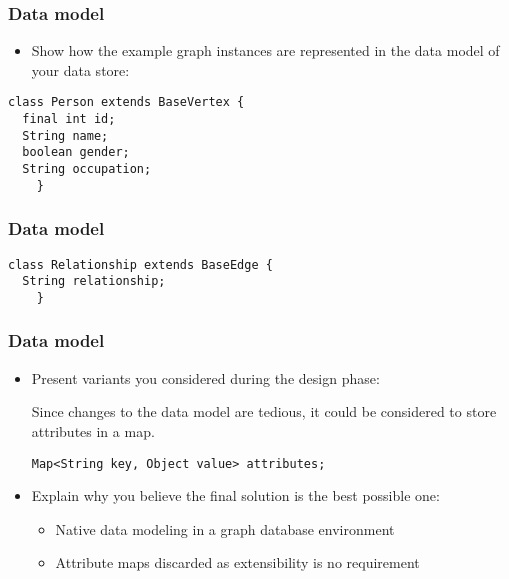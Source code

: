 
\begin{frame}[fragile]
\frametitle{Data model}

\begin{itemize}
	\item Show how the example graph instances are represented in the data model of your data store:
\end{itemize}

\begin{lstlisting}[caption=Person Mapping]
	class Person extends BaseVertex {
  final int id;
  String name;
  boolean gender;
  String occupation;
	}
\end{lstlisting}
\end{frame}


\begin{frame}[fragile]
\frametitle{Data model}
\begin{lstlisting}[caption=Relationship Mapping]
	class Relationship extends BaseEdge {
  String relationship;
	}
\end{lstlisting}
\end{frame}

\begin{frame}[fragile]
\frametitle{Data model}

\begin{itemize}
	\item Present variants you considered during the design phase:

Since changes to the data model are tedious, it could be considered to store
attributes in a map.

\begin{lstlisting}[caption=Alternative attribute storage.]
Map<String key, Object value> attributes;
\end{lstlisting}

	\item Explain why you believe the final solution is the best possible one:
	\begin{itemize}
		\item 	Native data modeling in a graph database environment
		\item Attribute maps discarded as extensibility is no requirement
	\end{itemize}
\end{itemize}

\end{frame}